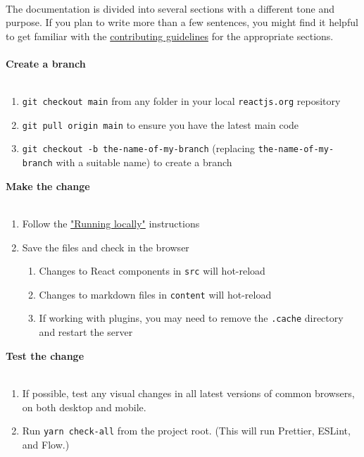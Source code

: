 \documentclass{article}
\begin{document}
\\
The documentation is divided into several sections with a different tone and purpose. If you plan to write more than a few sentences, you might find it helpful to get familiar with the \href{https://github.com/reactjs/reactjs.org/blob/main/CONTRIBUTING.md#guidelines-for-text}{contributing guidelines} for the appropriate sections.\\
\\
{\noindent \Large \textbf{Create a branch}}\\\\
\begin{enumerate}[label=\arabic*.]
	\item \verb|git checkout main| from any folder in your local \verb|reactjs.org| repository
	\item \verb|git pull origin main| to ensure you have the latest main code
	\item \verb|git checkout -b the-name-of-my-branch| (replacing \verb|the-name-of-my-branch| with a suitable name) to create a branch
\end{enumerate}
{\noindent \Large \textbf{Make the change}}\\\\
\begin{enumerate}[label=\arabic*.]
	\item Follow the \href{#running-locally}{"Running locally"} instructions
	\item Save the files and check in the browser
	\begin{enumerate}[label=\arabic*.]
		\item Changes to React components in \verb|src| will hot-reload
		\item Changes to markdown files in \verb|content| will hot-reload
		\item If working with plugins, you may need to remove the \verb|.cache| directory and restart the server
	\end{enumerate}
\end{enumerate}
{\noindent \Large \textbf{Test the change}}\\\\
\begin{enumerate}[label=\arabic*.]
	\item If possible, test any visual changes in all latest versions of common browsers, on both desktop and mobile.
	\item Run \verb|yarn check-all| from the project root. (This will run Prettier, ESLint, and Flow.)
\end{enumerate}
\end{document}
